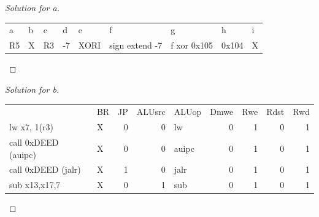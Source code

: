 \documentclass[12pt]{article}
\begin{document}
\begin{proof}[Solution for a]
	\centering
	\begin{tabular}{lllllllll}
		a     & b     & c     & d     & e     & f     & g     & h     & i \\
		R5 & X     & R3 & -7  & XORI   & sign extend -7 & f xor 0x105 & 0x104 & X \\
	\end{tabular}%
\end{proof}
\begin{proof}[Solution for b]
	\ \\
	\centering
	    \begin{tabular}{llrrlrrrr}
		& BR    & \multicolumn{1}{l}{JP} & \multicolumn{1}{l}{ALUsrc} & ALUop & \multicolumn{1}{l}{Dmwe} & \multicolumn{1}{l}{Rwe} & \multicolumn{1}{l}{Rdst} & \multicolumn{1}{l}{Rwd} \\
		lw x7, 1(r3) & X     & 0     & 0     & lw    & 0     & 1     & 0     & 1 \\
		call 0xDEED (auipc) & X     & 0     & 0     & auipc & 0     & 1     & 0     & 1 \\
		call 0xDEED (jalr) & X     & 1     & 0     & jalr  & 0     & 1     & 0     & 1 \\
		sub x13,x17,7 & X     & 0     & 1     & sub   & 0     & 1     & 0     & 1 \\
	\end{tabular}%

\end{proof}
\end{document}
